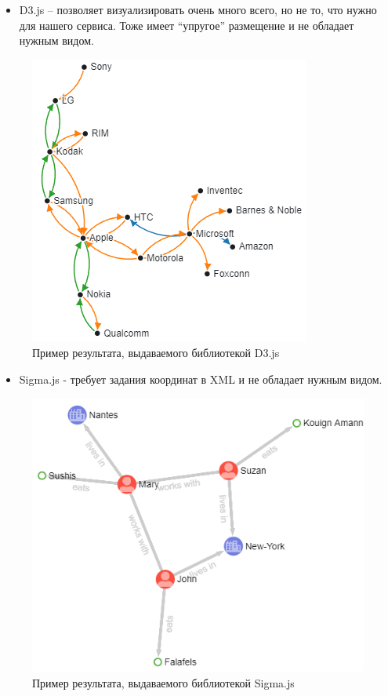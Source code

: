 \newpage
\begin{itemize}
\item D3.js – позволяет визуализировать очень много всего, но не то, что нужно для нашего сервиса. Тоже имеет “упругое” размещение и не обладает нужным видом.
\end{itemize}
\begin{figure}[h]
	\center
	\includegraphics [scale=1] {my_folder/images/my/17}
	\caption{Пример результата, выдаваемого библиотекой D3.js}
	\label{fig:17}
\end{figure}
\begin{itemize}
\item Sigma.js - требует задания координат в XML и не обладает нужным видом.
\end{itemize}
\begin{figure}[h]
	\center
	\includegraphics [scale=1] {my_folder/images/my/18}
	\caption{Пример результата, выдаваемого библиотекой Sigma.js}
	\label{fig:18}
\end{figure}
